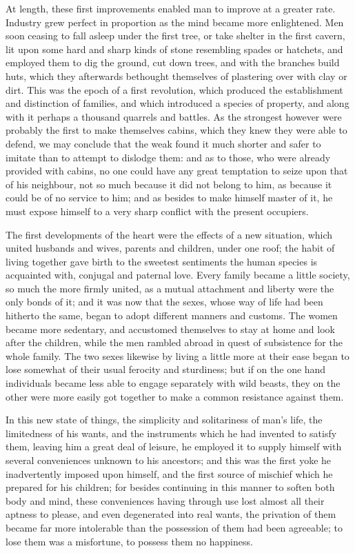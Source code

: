 \documentclass[11pt,twocolumn]{ltugboat}
\begin{document}
At length, these first improvements enabled man to improve at a
greater rate. Industry grew perfect in proportion as the mind became
more enlightened. Men soon ceasing to fall asleep under the first
tree, or take shelter in the first cavern, lit upon some hard and
sharp kinds of stone resembling spades or hatchets, and employed them
to dig the ground, cut down trees, and with the branches build huts,
which they afterwards bethought themselves of plastering over with
clay or dirt. This was the epoch of a first revolution, which produced
the establishment and distinction of families, and which introduced a
species of property, and along with it perhaps a thousand quarrels and
battles. As the strongest however were probably the first to make
themselves cabins, which they knew they were able to defend, we may
conclude that the weak found it much shorter and safer to imitate than
to attempt to dislodge them: and as to those, who were already
provided with cabins, no one could have any great temptation to seize
upon that of his neighbour, not so much because it did not belong to
him, as because it could be of no service to him; and as besides to
make himself master of it, he must expose himself to a very sharp
conflict with the present occupiers.

The first developments of the heart were the effects of a new
situation, which united husbands and wives, parents and children,
under one roof; the habit of living together gave birth to the
sweetest sentiments the human species is acquainted with, conjugal and
paternal love. Every family became a little society, so much the more
firmly united, as a mutual attachment and liberty were the only bonds
of it; and it was now that the sexes, whose way of life had been
hitherto the same, began to adopt different manners and customs. The
women became more sedentary, and accustomed themselves to stay at home
and look after the children, while the men rambled abroad in quest of
subsistence for the whole family. The two sexes likewise by living a
little more at their ease began to lose somewhat of their usual
ferocity and sturdiness; but if on the one hand individuals became
less able to engage separately with wild beasts, they on the other
were more easily got together to make a common resistance against
them.

In this new state of things, the simplicity and solitariness of man's
life, the limitedness of his wants, and the instruments which he had
invented to satisfy them, leaving him a great deal of leisure, he
employed it to supply himself with several conveniences unknown to his
ancestors; and this was the first yoke he inadvertently imposed upon
himself, and the first source of mischief which he prepared for his
children; for besides continuing in this manner to soften both body
and mind, these conveniences having through use lost almost all their
aptness to please, and even degenerated into real wants, the privation
of them became far more intolerable than the possession of them had
been agreeable; to lose them was a misfortune, to possess them no
happiness.
\end{document}
